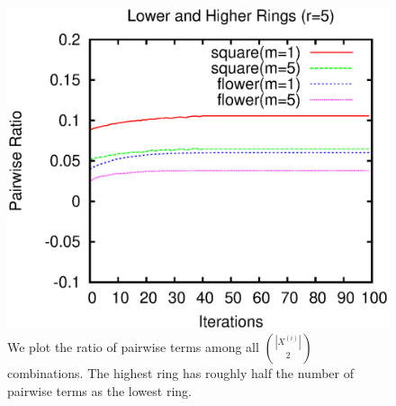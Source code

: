 \documentclass[smallextended]{svjour3}       %
\begin{document}
{{\begin{figure}[h!]
\center
\includegraphics[scale=0.5]{images/optimization/pairwise-ratio/plot-pairwiseratio-lowerHigher-concavities-probe.eps}
\caption{We plot the ratio of pairwise terms among all $\binom{|X^{(i)}|}{2}$ combinations. The highest ring has roughly half the number of pairwise terms as the lowest ring.}
\label{fig:ratio-pairwise-terms}
\end{figure}


}}
\end{document}

